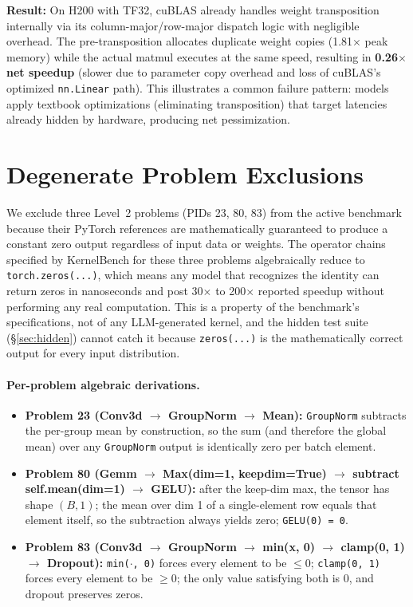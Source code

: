 \documentclass[]{fairmeta}
\begin{document}
\textbf{Result:} On H200 with TF32, cuBLAS already handles weight transposition internally via its column-major/row-major dispatch logic with negligible overhead. The pre-transposition allocates duplicate weight copies (1.81$\times$ peak memory) while the actual matmul executes at the same speed, resulting in \textbf{0.26$\times$ net speedup} (slower due to parameter copy overhead and loss of cuBLAS's optimized \texttt{nn.Linear} path). This illustrates a common failure pattern: models apply textbook optimizations (eliminating transposition) that target latencies already hidden by hardware, producing net pessimization.

\section{Degenerate Problem Exclusions}
\label{app:degenerate}

We exclude three Level~2 problems (PIDs 23, 80, 83) from the active benchmark because their PyTorch references are mathematically guaranteed to produce a constant zero output regardless of input data or weights. The operator chains specified by KernelBench for these three problems algebraically reduce to \texttt{torch.zeros(...)}, which means any model that recognizes the identity can return zeros in nanoseconds and post 30$\times$ to 200$\times$ reported speedup without performing any real computation. This is a property of the benchmark's specifications, not of any LLM-generated kernel, and the hidden test suite (\S\ref{sec:hidden}) cannot catch it because \texttt{zeros(...)} is the mathematically correct output for every input distribution.

\paragraph{Per-problem algebraic derivations.}
\begin{itemize}
\item \textbf{Problem 23 (Conv3d $\to$ GroupNorm $\to$ Mean):} \texttt{GroupNorm} subtracts the per-group mean by construction, so the sum (and therefore the global mean) over any \texttt{GroupNorm} output is identically zero per batch element.

\item \textbf{Problem 80 (Gemm $\to$ Max(dim=1, keepdim=True) $\to$ subtract self.mean(dim=1) $\to$ GELU):} after the keep-dim max, the tensor has shape $(B, 1)$; the mean over dim 1 of a single-element row equals that element itself, so the subtraction always yields zero; \texttt{GELU(0) = 0}.

\item \textbf{Problem 83 (Conv3d $\to$ GroupNorm $\to$ min(x, 0) $\to$ clamp(0, 1) $\to$ Dropout):} \texttt{min($\cdot$, 0)} forces every element to be $\le 0$; \texttt{clamp(0, 1)} forces every element to be $\ge 0$; the only value satisfying both is 0, and dropout preserves zeros.
\end{itemize}
\end{document}
